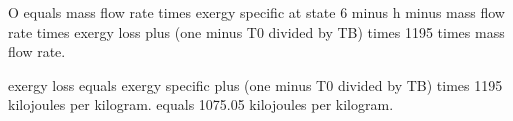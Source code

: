O equals mass flow rate times exergy specific at state 6 minus h minus mass flow rate times exergy loss plus (one minus T0 divided by TB) times 1195 times mass flow rate.  

exergy loss equals exergy specific plus (one minus T0 divided by TB) times 1195 kilojoules per kilogram.  
equals 1075.05 kilojoules per kilogram.